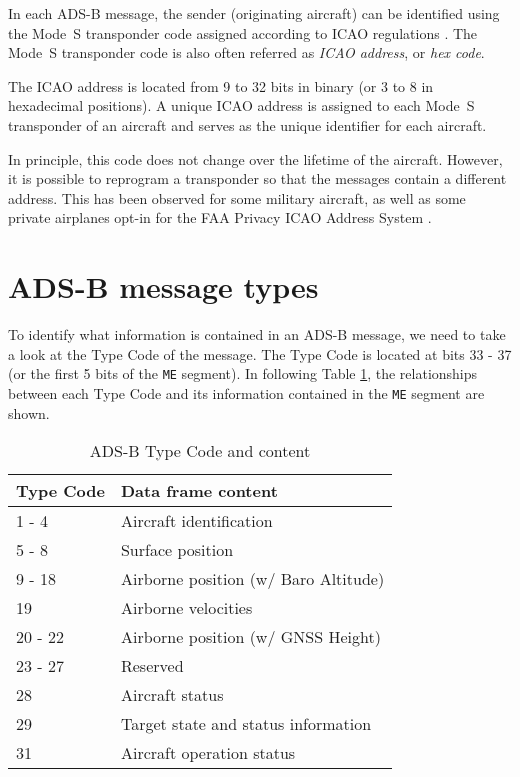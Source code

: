 In each ADS-B message, the sender (originating aircraft) can be identified using the Mode~S transponder code assigned according to ICAO regulations \cite{blythe2011}. The Mode~S transponder code is also often referred as \emph{ICAO address}, or \emph{hex code}. 

The ICAO address is located from 9 to 32 bits in binary (or 3 to 8 in hexadecimal positions). A unique ICAO address is assigned to each Mode~S transponder of an aircraft and serves as the unique identifier for each aircraft. 

In principle, this code does not change over the lifetime of the aircraft. However, it is possible to reprogram a transponder so that the messages contain a different address. This has been observed for some military aircraft, as well as some private airplanes opt-in for the FAA Privacy ICAO Address System \cite{gray2019}.


\section{ADS-B message types}

To identify what information is contained in an ADS-B message, we need to take a look at the Type Code of the message. The Type Code is located at bits 33 - 37 (or the first 5 bits of the \texttt{ME} segment). In following Table \ref{tb:adsb-tc}, the relationships between each Type Code and its information contained in the \texttt{ME} segment are shown.

\begin{table}[ht]
\centering
\caption{ADS-B Type Code and content}
\label{tb:adsb-tc}
\begin{tabular}{|l|l|}
\hline
\textbf{Type Code} & \textbf{Data frame content} \\  \hline \hline
1 - 4     & Aircraft identification              \\  \hline
5 - 8     & Surface position                     \\  \hline
9 - 18    & Airborne position (w/ Baro Altitude) \\  \hline
19        & Airborne velocities                  \\  \hline
20 - 22   & Airborne position (w/ GNSS Height)   \\  \hline
23 - 27   & Reserved                             \\  \hline
28        & Aircraft status                      \\  \hline
29        & Target state and status information  \\  \hline
31        & Aircraft operation status            \\  \hline
\end{tabular}
\end{table}



